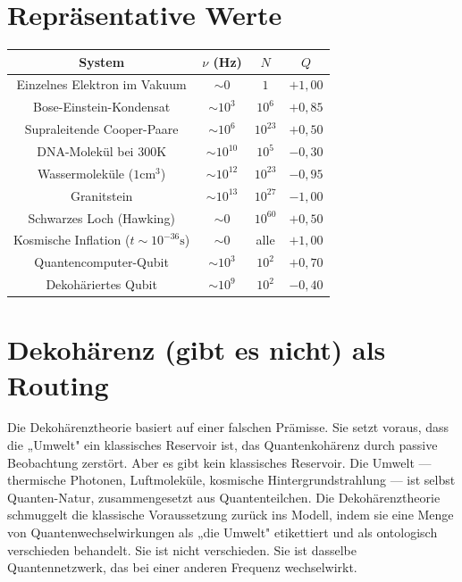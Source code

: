 \documentclass[12pt]{article}
\begin{document}
\section{Repräsentative Werte}

\begin{center}
\begin{tabular}{c|c|c|c}
System & $\nu$ (Hz) & $N$ & $Q$ \\
\hline
Einzelnes Elektron im Vakuum & $\sim 0$ & $1$ & $+1{,}00$ \\
Bose-Einstein-Kondensat & $\sim 10^3$ & $10^6$ & $+0{,}85$ \\
Supraleitende Cooper-Paare & $\sim 10^6$ & $10^{23}$ & $+0{,}50$ \\
DNA-Molekül bei $300\text{K}$ & $\sim 10^{10}$ & $10^5$ & $-0{,}30$ \\
Wassermoleküle ($1\text{cm}^3$) & $\sim 10^{12}$ & $10^{23}$ & $-0{,}95$ \\
Granitstein & $\sim 10^{13}$ & $10^{27}$ & $-1{,}00$ \\
Schwarzes Loch (Hawking) & $\sim 0$ & $10^{60}$ & $+0{,}50$ \\
Kosmische Inflation ($t \sim 10^{-36}\text{s}$) & $\sim 0$ & alle & $+1{,}00$ \\
Quantencomputer-Qubit & $\sim 10^3$ & $10^2$ & $+0{,}70$ \\
Dekohäriertes Qubit & $\sim 10^9$ & $10^2$ & $-0{,}40$ \\
\end{tabular}
\end{center}

\section{Dekohärenz (gibt es nicht) als Routing}

Die Dekohärenztheorie basiert auf einer falschen Prämisse. Sie setzt voraus, dass die „Umwelt" ein klassisches Reservoir ist, das Quantenkohärenz durch passive Beobachtung zerstört. Aber es gibt kein klassisches Reservoir. Die Umwelt — thermische Photonen, Luftmoleküle, kosmische Hintergrundstrahlung — ist selbst Quanten-Natur, zusammengesetzt aus Quantenteilchen. Die Dekohärenztheorie schmuggelt die klassische Voraussetzung zurück ins Modell, indem sie eine Menge von Quantenwechselwirkungen als „die Umwelt" etikettiert und als ontologisch verschieden behandelt. Sie ist nicht verschieden. Sie ist dasselbe Quantennetzwerk, das bei einer anderen Frequenz wechselwirkt.
\end{document}
